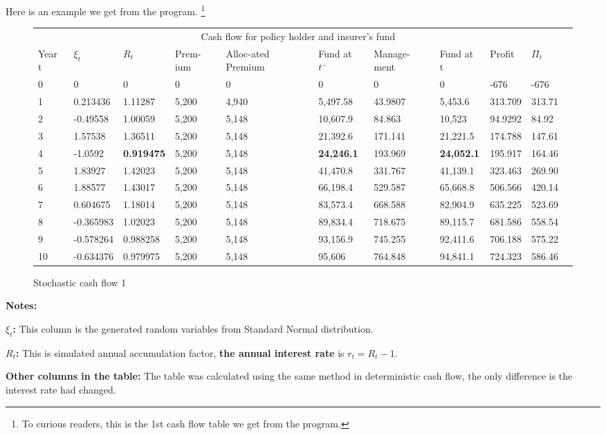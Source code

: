 \documentclass{report}
\begin{document}
Here is an example we get from the program. \footnote{To curious readers, this is the 1st cash flow table we get from the program.}


\begin{figure}[H]
    \centering
\begin{tabular}{p{0.5cm} p{1.5cm} p{1.3cm} p{1cm} p{1.5cm} p{1.2cm} p{1.3cm} p{1.3cm}p{1.3cm}p{1.3cm}p{1.3cm} }
\toprule
\multicolumn{10}{c}{Cash flow for policy holder and insurer's fund} \\
\cmidrule(r){3-8}

Year t & $\xi_t$ &$R_t$ & Prem-ium & Alloc-ated Premium & Fund at $t^-$ &Manage-ment & Fund at t& Profit& $\Pi_t$ \\
\midrule
0&0&0&0&0&0&0&0&-676&-676\\
1&0.213436&1.11287&5,200&4,940&5,497.58&43.9807&5,453.6&313.709&313.71\\
2&-0.49558&1.00059&5,200&5,148&10,607.9&84.863&10,523&94.9292&84.92\\
3&1.57538&1.36511&5,200&5,148&21,392.6&171.141&21,221.5&174.788&147.61\\
4&-1.0592&\textbf{0.919475}&5,200&5,148&\textbf{24,246.1}&193.969&\textbf{24,052.1}&195.917&164.46\\
5&1.83927&1.42023&5,200&5,148&41,470.8&331.767&41,139.1&323.463&269.90\\
6&1.88577&1.43017&5,200&5,148&66,198.4&529.587&65,668.8&506.566&420.14\\
7&0.604675&1.18014&5,200&5,148&83,573.4&668.588&82,904.9&635.225&523.69\\
8&-0.365983&1.02023&5,200&5,148&89,834.4&718.675&89,115.7&681.586&558.54\\
9&-0.578264&0.988258&5,200&5,148&93,156.9&745.255&92,411.6&706.188&575.22\\
10&-0.634376&0.979975&5,200&5,148&95,606&764.848&94,841.1&724.323&586.46\\

\bottomrule
\end{tabular}
\caption{Stochastic cash flow 1}
\label{stoch-cashflow}
\end{figure}

\textbf{Notes:}

\textbf{$\xi_t$:} This column is the generated random variables from Standard Normal distribution.

\textbf{$R_t$:} This is simulated annual accumulation factor, \textbf{the annual interest rate} is $r_t = R_t -1$.

\textbf{Other columns in the table:} The table was calculated using the same method in deterministic cash flow, the only difference is the interest rate had changed.
\end{document}
